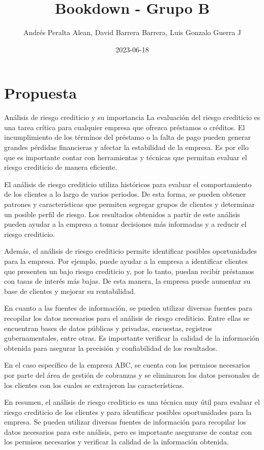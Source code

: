 \documentclass[
]{book}
\title{Bookdown - Grupo B}
\author{Andrés Peralta Alean, David Barrera Barrera, Luis Gonzalo Guerra J}
\date{2023-06-18}
\begin{document}
\maketitle

{
\setcounter{tocdepth}{1}
\tableofcontents
}
\hypertarget{propuesta}{%
\chapter{Propuesta}\label{propuesta}}

Análisis de riesgo crediticio y su importancia La evaluación del riesgo crediticio es una tarea crítica para cualquier empresa que ofrezca préstamos o créditos.
El incumplimiento de los términos del préstamo o la falta de pago pueden generar grandes pérdidas financieras y afectar la estabilidad de la empresa.
Es por ello que es importante contar con herramientas y técnicas que permitan evaluar el riesgo crediticio de manera eficiente.

El análisis de riesgo crediticio utiliza históricos para evaluar el comportamiento de los clientes a lo largo de varios periodos.
De esta forma, se pueden obtener patrones y características que permiten segregar grupos de clientes y determinar un posible perfil de riesgo.
Los resultados obtenidos a partir de este análisis pueden ayudar a la empresa a tomar decisiones más informadas y a reducir el riesgo crediticio.

Además, el análisis de riesgo crediticio permite identificar posibles oportunidades para la empresa.
Por ejemplo, puede ayudar a la empresa a identificar clientes que presenten un bajo riesgo crediticio y, por lo tanto, puedan recibir préstamos con tasas de interés más bajas.
De esta manera, la empresa puede aumentar su base de clientes y mejorar su rentabilidad.

En cuanto a las fuentes de información, se pueden utilizar diversas fuentes para recopilar los datos necesarios para el análisis de riesgo crediticio.
Entre ellas se encuentran bases de datos públicas y privadas, encuestas, registros gubernamentales, entre otras.
Es importante verificar la calidad de la información obtenida para asegurar la precisión y confiabilidad de los resultados.

En el caso específico de la empresa ABC, se cuenta con los permisos necesarios por parte del área de gestión de cobranzas y se eliminaron los datos personales de los clientes con los cuales se extrajeron las características.

En resumen, el análisis de riesgo crediticio es una técnica muy útil para evaluar el riesgo crediticio de los clientes y para identificar posibles oportunidades para la empresa.
Se pueden utilizar diversas fuentes de información para recopilar los datos necesarios para este análisis, pero es importante asegurarse de contar con los permisos necesarios y verificar la calidad de la información obtenida.
\end{document}
